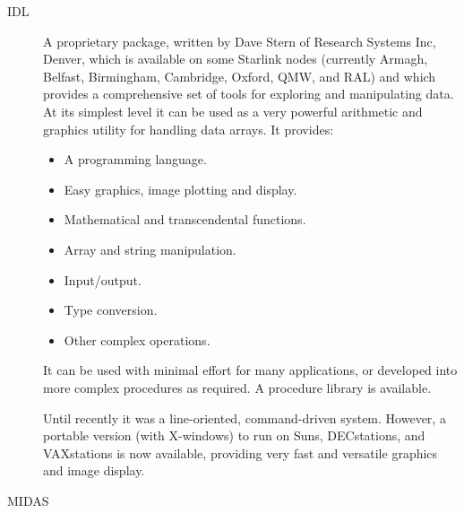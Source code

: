 \begin{description}

\item [IDL] \mbox{}

A proprietary package, written by Dave Stern of Research Systems Inc,
Denver, which is available on some Starlink nodes (currently Armagh, Belfast,
Birmingham, Cambridge, Oxford, QMW, and RAL) and which provides a comprehensive
set of tools for exploring and manipulating data.
At its simplest level it can be used as a very powerful arithmetic and
graphics utility for handling data arrays.
It provides:
\begin{itemize}
\item A programming language.
\item Easy graphics, image plotting and display.
\item Mathematical and transcendental functions.
\item Array and string manipulation.
\item Input/output.
\item Type conversion.
\item Other complex operations.
\end{itemize}
It can be used with minimal effort for many applications, or developed into
more complex procedures as required.
A procedure library is available.

Until recently it was a line-oriented, command-driven system.
However, a portable version (with X-windows) to run on Suns, DECstations, and
VAXstations is now available, providing very fast and versatile graphics and
image display.

\item [MIDAS] \mbox{}


\end{description}
